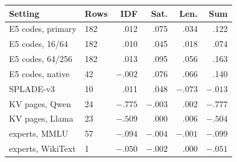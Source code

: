 \begin{tabular}{@{}llrrrr@{}}
\toprule
Setting & Rows & IDF & Sat. & Len. & Sum \\
\midrule
E5 codes, primary & 182 & .012 & .075 & .034 & .122 \\
E5 codes, 16/64 & 182 & .010 & .045 & .018 & .074 \\
E5 codes, 64/256 & 182 & .013 & .095 & .056 & .163 \\
E5 codes, native & 42 & $-.002$ & .076 & .066 & .140 \\
SPLADE-v3 & 10 & .011 & .048 & $-.073$ & $-.013$ \\
KV pages, Qwen & 24 & $-.775$ & $-.003$ & .002 & $-.777$ \\
KV pages, Llama & 23 & $-.509$ & .000 & .006 & $-.504$ \\
experts, MMLU & 57 & $-.094$ & $-.004$ & $-.001$ & $-.099$ \\
experts, WikiText & 1 & $-.050$ & $-.002$ & .000 & $-.051$ \\
\bottomrule
\end{tabular}
